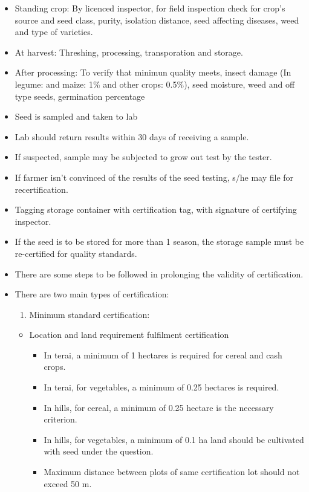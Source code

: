 \documentclass[
]{book}
\providecommand{\tightlist}{%
  \setlength{\itemsep}{0pt}\setlength{\parskip}{0pt}}
\begin{document}
\begin{itemize}
\item
  Standing crop: By licenced inspector, for field inspection check for crop's source and seed class, purity, isolation distance, seed affecting diseases, weed and type of varieties.
\item
  At harvest: Threshing, processing, transporation and storage.
\item
  After processing: To verify that minimun quality meets, insect damage (In legume: and maize: 1\% and other crops: 0.5\%), seed moisture, weed and off type seeds, germination percentage
\item
  Seed is sampled and taken to lab
\item
  Lab should return results within 30 days of receiving a sample.
\item
  If suspected, sample may be subjected to grow out test by the tester.
\item
  If farmer isn't convinced of the results of the seed testing, s/he may file for recertification.
\item
  Tagging storage container with certification tag, with signature of certifying inspector.
\item
  If the seed is to be stored for more than 1 season, the storage sample must be re-certified for quality standards.
\item
  There are some steps to be followed in prolonging the validity of certification.
\item
  There are two main types of certification:

  \begin{enumerate}
  \def\labelenumi{\arabic{enumi}.}
  \tightlist
  \item
    Minimum standard certification:
  \end{enumerate}

  \begin{itemize}
  \tightlist
  \item
    Location and land requirement fulfilment certification

    \begin{itemize}
    \tightlist
    \item
      In terai, a minimum of 1 hectares is required for cereal and cash crops.
    \item
      In terai, for vegetables, a minimum of 0.25 hectares is required.
    \item
      In hills, for cereal, a minimum of 0.25 hectare is the necessary criterion.
    \item
      In hills, for vegetables, a minimum of 0.1 ha land should be cultivated with seed under the question.
    \item
      Maximum distance between plots of same certification lot should not exceed 50 m.
    \end{itemize}
  \end{itemize}


\end{itemize}
\end{document}
